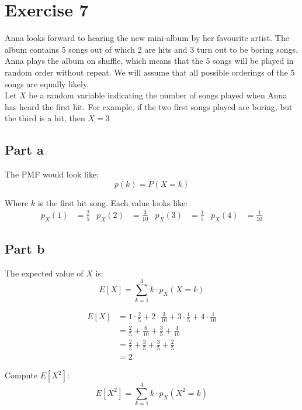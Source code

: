 \section{Exercise 7}
Anna looks forward to hearing the new mini-album by her favourite artist. The album contains 5 songs out of which 2 are hits and 3 turn out to be boring songs. Anna plays the album on shuffle, which means that the 5 songs will be played in random order without repeat. We will assume that all possible orderings of the 5 songs are equally likely.\\

Let $X$ be a random variable indicating the number of songs played when Anna has heard the first hit. For example, if the two first songs played are boring, but the third is a hit, then $X = 3$

\subsection{Part a}

The PMF would look like:
\[
	p(k)=P(X=k)
\]

Where $k$ is the first hit song. Each value looks like:
\begin{align*}
	p_X(1) & = \frac{2}{5}  &
	p_X(2) & = \frac{3}{10} &
	p_X(3) & = \frac{1}{5}  &
	p_X(4) & = \frac{1}{10}
\end{align*}

\subsection{Part b}

The expected value of $X$ is:
\[
	E[X] = \sum_{k=1}^{4} k \cdot p_X(X=k)
\]

\begin{align*}
	E[X] & = 1 \cdot \frac{2}{5} + 2 \cdot \frac{3}{10} + 3 \cdot \frac{1}{5} + 4 \cdot \frac{1}{10} \\
	     & = \frac{2}{5} + \frac{6}{10} + \frac{3}{5} + \frac{4}{10}                                 \\
	     & = \frac{2}{5} + \frac{3}{5} + \frac{3}{5} + \frac{2}{5}                                   \\
	     & = 2
\end{align*}

Compute $E[X^2]$:
\[
	E[X^2] = \sum_{k=1}^{4} k \cdot p_X(X^2=k)
\]

